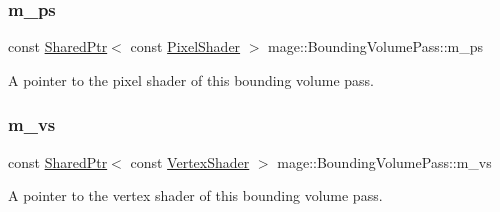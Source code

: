 \subsubsection{\texorpdfstring{m\+\_\+ps}{m\_ps}}
{\footnotesize\ttfamily const \hyperlink{namespacemage_a1e01ae66713838a7a67d30e44c67703e}{Shared\+Ptr}$<$ const \hyperlink{namespacemage_a27ecaf266420ee7a494d64edc0757129}{Pixel\+Shader} $>$ mage\+::\+Bounding\+Volume\+Pass\+::m\+\_\+ps\hspace{0.3cm}{\ttfamily [private]}}

A pointer to the pixel shader of this bounding volume pass. \hypertarget{classmage_1_1_bounding_volume_pass_aa10e1d4cc354b9b0d41789f453ea9cde}{}\label{classmage_1_1_bounding_volume_pass_aa10e1d4cc354b9b0d41789f453ea9cde} 
\subsubsection{\texorpdfstring{m\+\_\+vs}{m\_vs}}
{\footnotesize\ttfamily const \hyperlink{namespacemage_a1e01ae66713838a7a67d30e44c67703e}{Shared\+Ptr}$<$ const \hyperlink{classmage_1_1_vertex_shader}{Vertex\+Shader} $>$ mage\+::\+Bounding\+Volume\+Pass\+::m\+\_\+vs\hspace{0.3cm}{\ttfamily [private]}}

A pointer to the vertex shader of this bounding volume pass. 